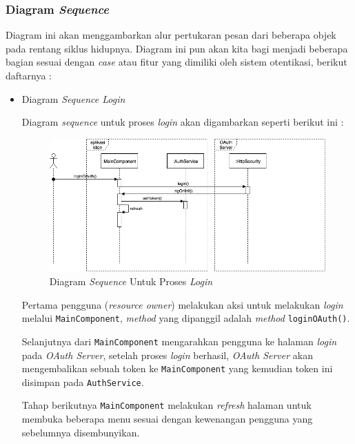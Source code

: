 \documentclass[pdftex,12pt, oneside]{article}
\begin{document}
\subsubsection{Diagram \textit{Sequence}}

Diagram ini akan menggambarkan alur pertukaran pesan dari beberapa objek pada rentang siklus hidupnya. Diagram ini pun akan kita bagi menjadi beberapa bagian sesuai dengan \textit{case} atau fitur yang dimiliki oleh sistem otentikasi, berikut daftarnya :

\begin{itemize}
	\item Diagram \textit{Sequence Login}
	
	Diagram \textit{sequence} untuk proses \textit{login} akan digambarkan seperti berikut ini :
	
	\begin{figure}[H]
		\centering
		\includegraphics[width=1\textwidth]{./resources/seq-dia-login}
		\caption{Diagram \textit{Sequence} Untuk Proses \textit{Login}}
		\label{fig:seq-dia-login}
	\end{figure}
	
	Pertama pengguna (\textit{resource owner}) melakukan aksi untuk melakukan \textit{login} melalui \texttt{MainComponent}, \textit{method} yang dipanggil adalah \textit{method} \texttt{loginOAuth()}. 
	
	Selanjutnya dari \texttt{MainComponent} mengarahkan pengguna ke halaman \textit{login} pada \textit{OAuth Server}, setelah proses \textit{login} berhasil, \textit{OAuth Server} akan mengembalikan sebuah token ke \texttt{MainComponent} yang kemudian token ini disimpan pada \texttt{AuthService}.
	
	Tahap berikutnya \texttt{MainComponent} melakukan \textit{refresh} halaman untuk membuka beberapa menu sesuai dengan kewenangan pengguna yang sebelumnya disembunyikan.
	

\end{itemize}
\end{document}
